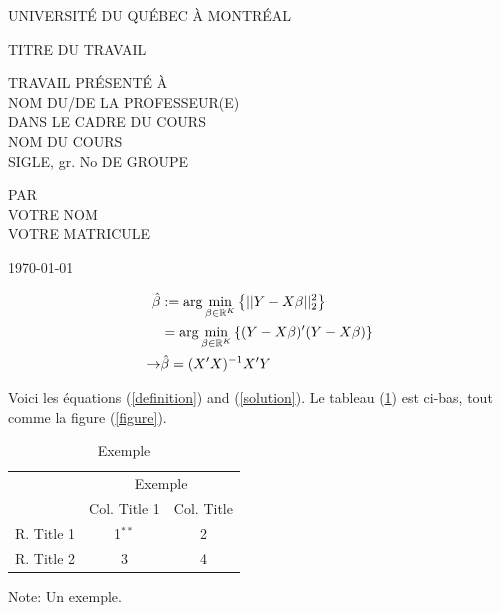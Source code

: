 \documentclass[12pt]{article}
\newcommand{\argmin}[1]{\arg\underset{#1}{\min}}
\newcommand{\CustomTitlePage}[8]{
	\begin{titlepage}
		\begin{center}
			
			UNIVERSITÉ DU QUÉBEC À MONTRÉAL \\
			\vspace{8em}
			
			#1 \\ %
			\vspace{8em}
			
			TRAVAIL PRÉSENTÉ À \\
			#2 \\ %
			\vspace{1em}
			DANS LE CADRE DU COURS \\
			#3 \\ %
			#4, gr. #5 \\ %
			\vspace{8em}
			
			PAR \\ %
			#6 \\
			#7 \\
			\vspace{8em}
			
			#8
			
		\end{center}
	\end{titlepage}
	
}
\begin{document}
	
	\CustomTitlePage{TITRE DU TRAVAIL}{NOM DU/DE LA PROFESSEUR(E)}{NOM DU COURS}{SIGLE}{No DE GROUPE}{VOTRE NOM}{VOTRE MATRICULE}{\today}
		
	\begin{align} %
		\hat{\beta} &:= \argmin{\beta \in \mathbb{R}^K} \left\{ || Y - X\beta ||_2^2 \right\} \label{definition} \\
		            &= \argmin{\beta \in \mathbb{R}^K} \left\{ (Y - X\beta)'(Y - X\beta) \right\} \notag \\ 
		\rightarrow & \hat{\beta} = (X'X)^{-1}X'Y \label{solution}
	\end{align}   %
	
	Voici les équations (\ref{definition}) and (\ref{solution}). Le tableau (\ref{table}) est ci-bas, tout comme la figure (\ref{figure}).
	
	\begin{table}[H] %
		\begin{center}
			\caption{Exemple} \label{table} %
			\begin{tabular}{l|cc}           %
				\toprule \toprule
				& \multicolumn{2}{c}{Exemple} \\
				& Col. Title 1 & Col. Title \\ \midrule
				R. Title 1 & 1$^{**}$ & 2 \\
				R. Title 2 & 3 & 4 \\ \bottomrule \bottomrule
			\end{tabular}
		\end{center}
		\begin{footnotesize}
			\flushleft         %
			Note: Un exemple.  %
		\end{footnotesize}
	\end{table}
	
\end{document}
